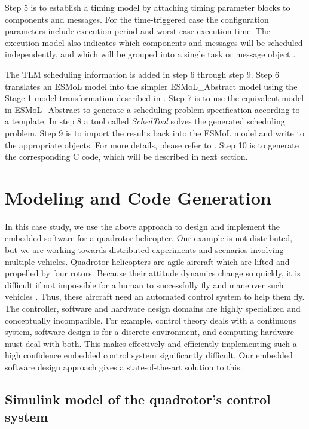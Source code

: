 \documentclass[10pt, conference, compsocconf]{IEEEtran}
\begin{document}
Step 5 is to establish a timing model by attaching timing parameter blocks to components and messages. For the time-triggered case the configuration parameters include execution period and worst-case execution time. The execution model also indicates which components and messages will be scheduled independently, and which will be grouped into a single task or message object \cite{modeling:esmol}.

The TLM scheduling information is added in step 6 through step 9. Step 6 translates an ESMoL model into the simpler ESMoL\_Abstract model using the Stage 1 model transformation described in \cite{modeling:esmol}. Step 7 is to use the equivalent model in ESMoL\_Abstract to generate a scheduling problem specification according to a template. In step 8 a tool called \emph{SchedTool} solves the generated scheduling problem. Step 9 is to import the results back into the ESMoL model and write to the appropriate objects. For more details, please refer to \cite{modeling:esmol}. Step 10 is to generate the corresponding C code, which will be described in next section.


\section{Modeling and Code Generation}

In this case study, we use the above approach to design and implement the embedded software for a quadrotor helicopter. Our example is not distributed, but we are working towards distributed experiments and scenarios involving multiple vehicles. Quadrotor helicopters are agile aircraft which are lifted and propelled by four rotors. Because their attitude dynamics change so quickly, it is difficult if not impossible for a human to successfully fly and maneuver such vehicles \cite{quad:passcontrol}. Thus, these aircraft need an automated control system to help them fly. The controller, software and hardware design domains are highly specialized and conceptually incompatible. For example, control theory deals with a continuous system, software design is for a discrete environment, and computing hardware must deal with both. This makes effectively and efficiently implementing such a high confidence embedded control system significantly difficult. Our embedded software design approach gives a state-of-the-art solution to this.

\subsection{Simulink model of the quadrotor's control system}
\end{document}
